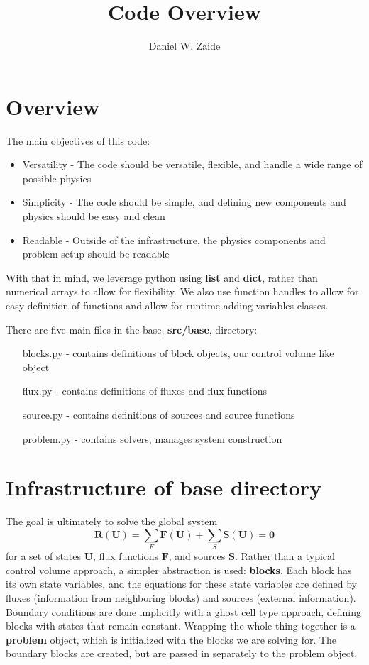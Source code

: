 \documentclass[11pt]{article}
\title{Code Overview}
\author{Daniel W. Zaide}
\begin{document}
\maketitle

\section{Overview}

The main objectives of this code:
\begin{itemize}
\item Versatility - The code should be versatile, flexible, and handle a wide range of possible physics
\item Simplicity - The code should be simple, and defining new components and physics should be easy and clean
\item Readable - Outside of the infrastructure, the physics components and problem setup should be readable
\end{itemize}

With that in mind, we leverage python using {\bf list} and {\bf dict}, rather than numerical arrays to allow for flexibility. We also use function handles to allow for easy definition of functions and allow for runtime adding variables classes.

There are five main files in the base, {\bf src/base}, directory:
\begin{itemize}
\item [blocks.py] - contains definitions of block objects, our control volume like object
\item [flux.py] - contains definitions of fluxes and flux functions
\item [source.py] - contains definitions of sources and source functions
\item [problem.py] - contains solvers, manages system construction
\end{itemize}
\section{Infrastructure of base directory}
The goal is ultimately to solve the global system
\begin{equation}
\mathbf{R}(\mathbf{U}) = \sum_F \mathbf{F}(\mathbf{U}) + \sum_S \mathbf{S}(\mathbf{U}) = \mathbf{0}
\end{equation}
for a set of states $\mathbf{U}$, flux functions $\mathbf{F}$, and sources $\mathbf{S}$. Rather than a typical control volume approach, a simpler abstraction is used: {\bf blocks}. Each block has its own state variables, and the equations for these state variables are defined by fluxes (information from neighboring blocks) and sources (external information). Boundary conditions are done implicitly with a ghost cell type approach, defining blocks with states that remain constant. Wrapping the whole thing together is a {\bf problem} object, which is initialized with the blocks we are solving for. The boundary blocks are created, but are passed in separately to the problem object.
\end{document}
